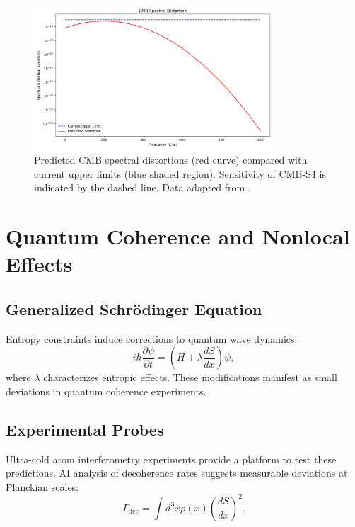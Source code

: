 \documentclass[12pt]{article}
\begin{document}
\begin{figure}[h!]
    \centering
    \includegraphics[width=0.8\textwidth]{cmb_spectral_distortion.png} %
    \caption{Predicted CMB spectral distortions (red curve) compared with current upper limits (blue shaded region). Sensitivity of CMB-S4 is indicated by the dashed line. Data adapted from \cite{CMB-S42023}.}
    \label{fig:cmb_spectral_distortion}
\end{figure}

\section{Quantum Coherence and Nonlocal Effects}
\subsection{Generalized Schrödinger Equation}
Entropy constraints induce corrections to quantum wave dynamics:
\begin{equation}
i \hbar \frac{\partial \psi}{\partial t} = \left(H + \lambda \frac{dS}{dx}\right) \psi,
\end{equation}
where $\lambda$ characterizes entropic effects. These modifications manifest as small deviations in quantum coherence experiments.

\subsection{Experimental Probes}
Ultra-cold atom interferometry experiments \cite{Kasevich2023} provide a platform to test these predictions. AI analysis of decoherence rates suggests measurable deviations at Planckian scales:
\begin{equation}
\Gamma_{\text{dec}} = \int d^3x \rho(x) \left(\frac{dS}{dx}\right)^2.
\end{equation}
\end{document}
